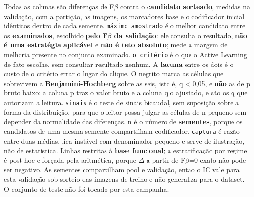 \footnotesize Todas as colunas são diferenças de F$\beta$ contra o \textbf{candidato sorteado}, medidas na validação, com a partição, as imagens, os marcadores base e o codificador inicial idênticos dentro de cada semente. \texttt{máximo amostrado} é o melhor candidato entre os \textbf{examinados}, escolhido \textbf{pelo F$\beta$ da validação}: ele consulta o resultado, \textbf{não é uma estratégia aplicável} e \textbf{não é teto absoluto}; mede a margem de melhoria presente no conjunto examinado. \texttt{o critério} é o que o Active Learning de fato escolhe, sem consultar resultado nenhum. A \textbf{lacuna} entre os dois é o custo de o critério errar o lugar do clique. O negrito marca as células que sobrevivem a \textbf{Benjamini-Hochberg} sobre as seis, isto é, q < 0,05, e \textbf{não} as de p bruto baixo: a coluna p traz o valor bruto e a coluna q o ajustado, e são os q que autorizam a leitura. \texttt{sinais} é o teste de sinais bicaudal, sem suposição sobre a forma da distribuição, para que o leitor possa julgar as células de n pequeno sem depender da normalidade das diferenças. n é o número de \textbf{sementes}, porque os candidatos de uma mesma semente compartilham codificador. \texttt{captura} é razão entre duas médias, fica instável com denominador pequeno e serve de ilustração, não de estatística. Linhas restritas à \textbf{base funcional}; a estratificação por regime é post-hoc e forçada pela aritmética, porque $\Delta$ a partir de F$\beta$=0 exato não pode ser negativo. As sementes compartilham pool e validação, então o IC vale para esta validação sob sorteio das imagens de treino e não generaliza para o dataset. O conjunto de teste não foi tocado por esta campanha.
\normalsize
